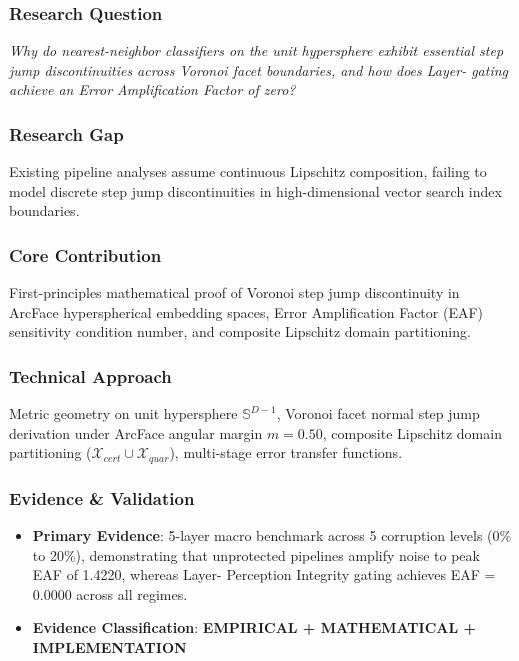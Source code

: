\documentclass[11pt,letterpaper]{article}
\begin{document}
\subsubsection{Research Question}
\begin{tcolorbox}[colback=blue!3!white,colframe=blue!50!black,title=Primary Scientific Question]
\textit{Why do nearest-\allowbreak neighbor classifiers on the unit hypersphere exhibit essential step jump discontinuities across Voronoi facet boundaries, and how does Layer- gating achieve an Error Amplification Factor of zero?}
\end{tcolorbox}

\subsubsection{Research Gap}
Existing pipeline analyses assume continuous Lipschitz composition, failing to model discrete step jump discontinuities in high-\allowbreak dimensional vector search index boundaries.

\subsubsection{Core Contribution}
First-\allowbreak principles mathematical proof of Voronoi step jump discontinuity in ArcFace hyperspherical embedding spaces, Error Amplification Factor (EAF) sensitivity condition number, and composite Lipschitz domain partitioning.

\subsubsection{Technical Approach}
Metric geometry on unit hypersphere $\mathbb{S}^{D-1}$, Voronoi facet normal step jump derivation under ArcFace angular margin $m=0.50$, composite Lipschitz domain partitioning ($\mathcal{X}_{cert} \cup \mathcal{X}_{quar}$), multi-\allowbreak stage error transfer functions.

\subsubsection{Evidence \& Validation}
\begin{itemize}[leftmargin=*]
    \item \textbf{Primary Evidence}: 5-\allowbreak layer macro benchmark across 5 corruption levels (0\% to 20\%), demonstrating that unprotected pipelines amplify noise to peak EAF of 1.4220, whereas Layer- Perception Integrity gating achieves EAF = 0.0000 across all regimes.
    \item \textbf{Evidence Classification}: \textbf{EMPIRICAL + MATHEMATICAL + IMPLEMENTATION}
\end{itemize}
\end{document}
